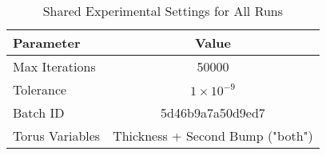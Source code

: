 \begin{table}[h!]
\centering
\caption{Shared Experimental Settings for All Runs}
\begin{tabular}{|l|c|}
\hline
\textbf{Parameter} & \textbf{Value} \\
\hline
Max Iterations & 50000 \\
Tolerance & $1 \times 10^{-9}$ \\
Batch ID & 5d46b9a7a50d9ed7 \\
Torus Variables & Thickness + Second Bump ("both") \\
\hline
\end{tabular}
\end{table}
